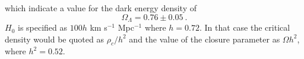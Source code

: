 \documentclass[12pt,a4paper]{article}
\begin{document}
which indicate a value for the dark energy density of
\begin{equation}
\Omega_\Lambda = 0.76 \pm 0.05 ~.
\end{equation}
$H_0$ is specified as $100 h$ km s$^{-1}$ Mpc$^{-1}$ where $h = 0.72$. In that case the critical density would be quoted as $\rho_c/h^2$ and the value of the closure parameter as $\Omega h^2$, where $h^2 = 0.52$. 
\end{document}
